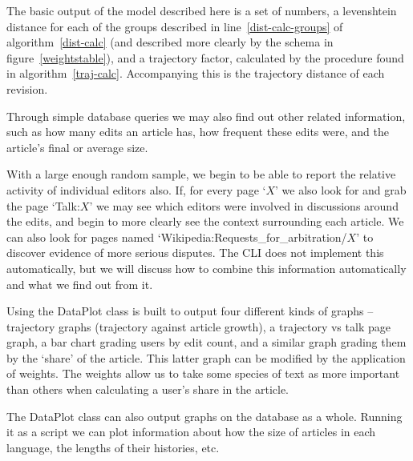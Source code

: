 The basic output of the model described here is a set of numbers, a
levenshtein distance for each of the groups described in
line~\ref{dist-calc-groups} of algorithm~\ref{dist-calc} (and
described more clearly by the schema in figure~\ref{weightstable}),
and a trajectory factor, calculated by the procedure found in
algorithm~\ref{traj-calc}. Accompanying this is the trajectory
distance of each revision.

Through simple database queries we may also find out other related
information, such as how many edits an article has, how frequent these
edits were, and the article's final or average size.

With a large enough random sample, we begin to be able to report the
relative activity of individual editors also. If, for every page `$X$'
we also look for and grab the page `Talk:$X$' we may see which editors
were involved in discussions around the edits, and begin to more
clearly see the context surrounding each article. We can also look for
pages named `Wikipedia:Requests\_for\_arbitration/$X$' to discover
evidence of more serious disputes. The CLI does not implement this
automatically, but we will discuss how to combine this information
automatically and what we find out from it.

Using the DataPlot class is built to output four different kinds of
graphs -- trajectory graphs (trajectory against article growth), a
trajectory vs talk page graph, a bar chart grading users by edit
count, and a similar graph grading them by the `share' of the
article. This latter graph can be modified by the application of
weights. The weights allow us to take some species of text as more
important than others when calculating a user's share in the article.

The DataPlot class can also output graphs on the database as a
whole. Running it as a script we can plot information about how the
size of articles in each language, the lengths of their histories,
etc.
